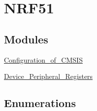 \hypertarget{group__n_r_f51}{}\section{N\+R\+F51}
\label{group__n_r_f51}
\subsection*{Modules}
\begin{DoxyCompactItemize}
\item 
\hyperlink{group___configuration__of___c_m_s_i_s}{Configuration\+\_\+of\+\_\+\+C\+M\+S\+I\+S}
\item 
\hyperlink{group___device___peripheral___registers}{Device\+\_\+\+Peripheral\+\_\+\+Registers}
\end{DoxyCompactItemize}
\subsection*{Enumerations}

